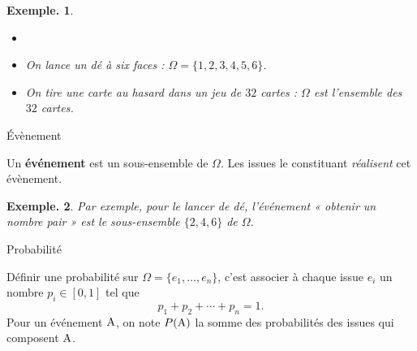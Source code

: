 \documentclass[12pt]{article}
\theoremstyle{break}
\newtheorem*{example}{Exemple.}
\begin{document}
\begin{example}
  \begin{itemize}
    \item[]
    \item On lance un dé à six faces : $\Omega = \{1,2,3,4,5,6\}$.
    \item On tire une carte au hasard dans un jeu de $32$ cartes : $\Omega$ est l'ensemble des $32$ cartes.
  \end{itemize}
\end{example}
 
\begin{definition}{Évènement}{}
  \begin{multihide}
  Un \textbf{événement} est un sous-ensemble de $\Omega$. Les issues le constituant \emph{réalisent} cet évènement.
  \end{multihide}
\end{definition}
\begin{example}
  Par exemple, pour le lancer de dé, l'événement « obtenir un nombre pair » est le sous-ensemble $\{2,4,6\}$ de $\Omega$.
\end{example}
 
\begin{definition}{Probabilité}{}
  \begin{multihide}
Définir une probabilité sur $\Omega=\{e_1,\dots,e_n\}$, c'est associer à chaque issue $e_i$ un nombre $p_i\in[0,1]$ tel que
\[
p_1+p_2+\cdots+p_n = 1.
\]
  Pour un événement $\mathrm{A}$, on note $P(\mathrm{A})$ la somme des probabilités des issues qui composent $\mathrm{A}$.
  \end{multihide}
\end{definition}
\end{document}
